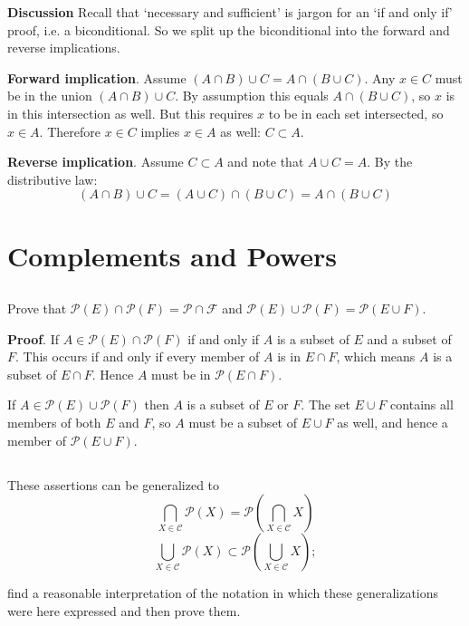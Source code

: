 \documentclass{article}
\begin{document}
\textbf{Discussion} Recall that `necessary and sufficient' is jargon for an `if and only if' proof, i.e. a biconditional. So we split up the biconditional into the forward and reverse implications.

\textbf{Forward implication}. Assume $(A \cap B) \cup C = A \cap (B \cup C)$. Any $x \in C$ must be in the union $(A \cap B) \cup C$. By assumption this equals $A \cap (B \cup C)$, so $x$ is in this intersection as well. But this requires $x$ to be in each set intersected, so $x \in A$. Therefore $x \in C$ implies $x \in A$ as well: $C \subset A$.

\textbf{Reverse implication}. Assume $C \subset A$ and note that $A \cup C = A$. By the distributive law:
$$(A \cap B) \cup C = (A \cup C) \cap (B \cup C) = A \cap (B \cup C)$$

\section{Complements and Powers}

\subsection{} Prove that $\mathscr{P}(E) \cap \mathscr{P}(F) = \mathcal{P \cap F}$ and $\mathscr{P}(E) \cup \mathscr{P}(F) = \mathscr{P}(E \cup F)$.

\textbf{Proof}. If $A \in \mathscr{P}(E) \cap \mathscr{P}(F)$ if and only if $A$ is a subset of $E$ and a subset of $F$. This occurs if and only if every member of $A$ is in $E \cap F$, which means $A$ is a subset of $E \cap F$. Hence $A$ must be in $\mathscr{P}(E \cap F)$.

If $A \in \mathscr{P}(E) \cup \mathscr{P}(F)$ then $A$ is a subset of $E$ or $F$. The set $E \cup F$ contains all members of both $E$ and $F$, so $A$ must be a subset of $E \cup F$ as well, and hence a member of $\mathscr{P}(E \cup F)$. 

\subsection{} These assertions can be generalized to 
$$ \bigcap_{X \in \mathcal{C}} \mathscr{P}(X) = \mathscr{P}\left(\bigcap_{X \in \mathcal{C}} X\right)$$
$$ \bigcup_{X \in \mathcal{C}} \mathscr{P}(X) \subset \mathscr{P}\left(\bigcup_{X \in \mathcal{C}} X\right);$$

find a reasonable interpretation of the notation in which these generalizations were here expressed and then prove them.
\end{document}
